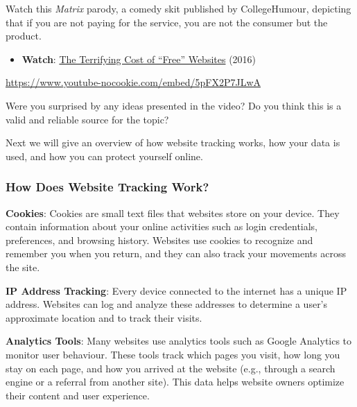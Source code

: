 \documentclass[
  letterpaper,
  DIV=11,
  numbers=noendperiod]{scrreprt}
\providecommand{\tightlist}{%
  \setlength{\itemsep}{0pt}\setlength{\parskip}{0pt}}\usepackage{longtable,booktabs,array}
\begin{document}
\begin{tcolorbox}[enhanced jigsaw, toprule=.15mm, colback=white, colframe=quarto-callout-note-color-frame, bottomtitle=1mm, leftrule=.75mm, coltitle=black, titlerule=0mm, rightrule=.15mm, colbacktitle=quarto-callout-note-color!10!white, left=2mm, title={Learning Activity}, opacitybacktitle=0.6, opacityback=0, breakable, toptitle=1mm, arc=.35mm, bottomrule=.15mm]

Watch this \emph{Matrix} parody, a comedy skit published by
CollegeHumour, depicting that if you are not paying for the service, you
are not the consumer but the product.

\begin{itemize}
\tightlist
\item
  \textbf{Watch}: \href{https://www.youtube.com/watch?v=5pFX2P7JLwA}{The
  Terrifying Cost of ``Free'' Websites} (2016)
\end{itemize}

\url{https://www.youtube-nocookie.com/embed/5pFX2P7JLwA}

\end{tcolorbox}

Were you surprised by any ideas presented in the video? Do you think
this is a valid and reliable source for the topic?

Next we will give an overview of how website tracking works, how your
data is used, and how you can protect yourself online.

\subsubsection*{How Does Website Tracking
Work?}\label{how-does-website-tracking-work}

\textbf{Cookies}: Cookies are small text files that websites store on
your device. They contain information about your online activities such
as login credentials, preferences, and browsing history. Websites use
cookies to recognize and remember you when you return, and they can also
track your movements across the site.

\textbf{IP Address Tracking}: Every device connected to the internet has
a unique IP address. Websites can log and analyze these addresses to
determine a user's approximate location and to track their visits.

\textbf{Analytics Tools}: Many websites use analytics tools such as
Google Analytics to monitor user behaviour. These tools track which
pages you visit, how long you stay on each page, and how you arrived at
the website (e.g., through a search engine or a referral from another
site). This data helps website owners optimize their content and user
experience.
\end{document}
